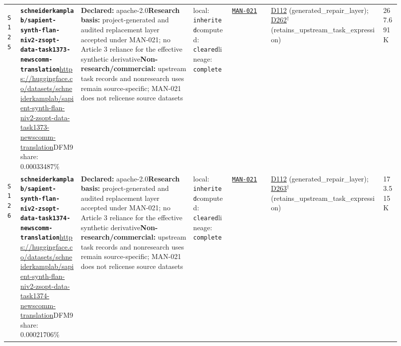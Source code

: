 \documentclass[9pt,a4paper]{article}
\newcommand{\srcid}[1]{\hypertarget{src:#1}{\texttt{#1}}}
\begin{document}
\begin{landscape}
\begin{longtable}{@{}L{0.03\linewidth}L{0.14\linewidth}L{0.26\linewidth}L{0.09\linewidth}L{0.09\linewidth}L{0.265\linewidth}L{0.045\linewidth}@{}}
\srcid{S125} & \textbf{\nolinkurl{schneiderkamplab/sapient-synth-flan-niv2-zsopt-data-task1373-newscomm-translation}}\newline \url{https://huggingface.co/datasets/schneiderkamplab/sapient-synth-flan-niv2-zsopt-data-task1373-newscomm-translation}\newline DFM9 share: 0.00033487\% & \textbf{Declared:} apache-2.0\newline \textbf{Research basis:} project-generated and audited replacement layer accepted under MAN-021; no Article 3 reliance for the effective synthetic derivative\newline \textbf{Non-research/commercial:} upstream task records and nonresearch uses remain source-specific; MAN-021 does not relicense source datasets & local: \texttt{inherited}\newline computed: \texttt{cleared}\newline lineage: \texttt{complete} & \hyperlink{manual:MAN-021}{\texttt{MAN-021}} & \hyperlink{dep:D112}{D112} (generated\_repair\_layer); \hyperlink{dep:D262}{D262}$^{\dagger}$ (retains\_upstream\_task\_expression) & 267.691K \\
\srcid{S126} & \textbf{\nolinkurl{schneiderkamplab/sapient-synth-flan-niv2-zsopt-data-task1374-newscomm-translation}}\newline \url{https://huggingface.co/datasets/schneiderkamplab/sapient-synth-flan-niv2-zsopt-data-task1374-newscomm-translation}\newline DFM9 share: 0.00021706\% & \textbf{Declared:} apache-2.0\newline \textbf{Research basis:} project-generated and audited replacement layer accepted under MAN-021; no Article 3 reliance for the effective synthetic derivative\newline \textbf{Non-research/commercial:} upstream task records and nonresearch uses remain source-specific; MAN-021 does not relicense source datasets & local: \texttt{inherited}\newline computed: \texttt{cleared}\newline lineage: \texttt{complete} & \hyperlink{manual:MAN-021}{\texttt{MAN-021}} & \hyperlink{dep:D112}{D112} (generated\_repair\_layer); \hyperlink{dep:D263}{D263}$^{\dagger}$ (retains\_upstream\_task\_expression) & 173.515K \\

\end{longtable}
\end{landscape}
\end{document}

